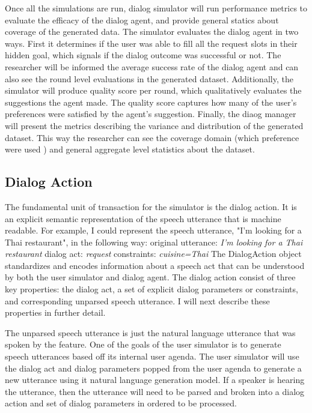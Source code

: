 Once all the simulations are run, dialog simulator will run performance metrics to evaluate the efficacy of the dialog agent, and provide general statics about coverage of the generated data. The simulator evaluates the dialog agent in two ways. First it determines if the user was able to fill all the request slots in their hidden goal, which signals if the dialog outcome was successful or not. The researcher will be informed the average success rate of the dialog agent and can also see the round level evaluations in the generated dataset. Additionally, the simulator will produce quality score per round, which qualitatively evaluates the suggestions the agent made. The quality score captures how many of the user's preferences were satisfied by the agent's suggestion. Finally, the diaog manager will present the metrics describing the variance and distribution of the generated dataset. This way the researcher can see the coverage domain (which preference were used ) and general aggregate level statistics about the dataset. 

\subsection{Dialog Action}

The fundamental unit of transaction for the simulator is the dialog action. It is an explicit semantic representation of the speech utterance that is machine readable. For example, I could represent the speech utterance, "I'm looking for a  Thai restaurant", in the following way:
	original utterance: \textit{I'm looking for a Thai restaurant}
	dialog act: \textit{request}
	constraints: \textit{cuisine=Thai}
The DialogAction object standardizes and encodes information about a speech act that can be understood by both the user simulator and dialog agent. The dialog action consist of three key properties: the dialog act, a set of explicit dialog parameters or constraints, and corresponding unparsed speech utterance. I will next describe these properties in further detail. 

The unparsed speech utterance is just the natural language utterance that was spoken by the feature. One of the goals of the user simulator is to generate speech utterances based off its internal user agenda. The user simulator will use the dialog act and dialog parameters popped from the user agenda to generate a new utterance using it natural language generation model. If a speaker is hearing the utterance, then the utterance will need to be parsed and broken into a dialog action and set of dialog parameters in ordered to be processed. 

